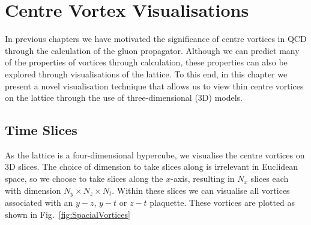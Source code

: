 
\chapter{Centre Vortex Visualisations}
In previous chapters we have motivated the significance of centre vortices in QCD through the calculation of the gluon propagator. Although we can predict many of the properties of vortices through calculation, these properties can also be explored through visualisations of the lattice. To this end, in this chapter we present a novel visualisation technique that allows us to view thin centre vortices on the lattice through the use of three-dimensional (3D) models.

\section{Time Slices}
As the lattice is a four-dimensional hypercube, we visualise the centre vortices on 3D slices. The choice of dimension to take slices along is irrelevant in Euclidean space, so we choose to take slices along the $x$-axis, resulting in $N_x$ slices each with dimension $N_y\times N_z\times N_t$. Within these slices we can visualise all vortices associated with an $y-z$, $y-t$ or $z-t$ plaquette. These vortices are plotted as shown in Fig.~\ref{fig:SpacialVortices}

